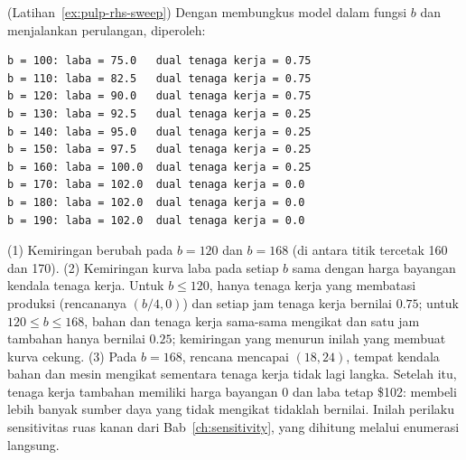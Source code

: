 \begin{solution}(Latihan~\ref{ex:pulp-rhs-sweep})
Dengan membungkus model dalam fungsi $b$ dan menjalankan perulangan, diperoleh:
\begin{verbatim}
b = 100: laba = 75.0   dual tenaga kerja = 0.75
b = 110: laba = 82.5   dual tenaga kerja = 0.75
b = 120: laba = 90.0   dual tenaga kerja = 0.75
b = 130: laba = 92.5   dual tenaga kerja = 0.25
b = 140: laba = 95.0   dual tenaga kerja = 0.25
b = 150: laba = 97.5   dual tenaga kerja = 0.25
b = 160: laba = 100.0  dual tenaga kerja = 0.25
b = 170: laba = 102.0  dual tenaga kerja = 0.0
b = 180: laba = 102.0  dual tenaga kerja = 0.0
b = 190: laba = 102.0  dual tenaga kerja = 0.0
\end{verbatim}
(1) Kemiringan berubah pada $b = 120$ dan $b = 168$ (di antara titik tercetak 160 dan 170).
(2) Kemiringan kurva laba pada setiap $b$ sama dengan harga bayangan kendala tenaga kerja. Untuk $b \leq 120$, hanya tenaga kerja yang membatasi produksi (rencananya $(b/4, 0)$) dan setiap jam tenaga kerja bernilai $0.75$; untuk $120 \leq b \leq 168$, bahan dan tenaga kerja sama-sama mengikat dan satu jam tambahan hanya bernilai $0.25$; kemiringan yang menurun inilah yang membuat kurva cekung.
(3) Pada $b = 168$, rencana mencapai $(18, 24)$, tempat kendala bahan dan mesin mengikat sementara tenaga kerja tidak lagi langka. Setelah itu, tenaga kerja tambahan memiliki harga bayangan $0$ dan laba tetap \$102: membeli lebih banyak sumber daya yang tidak mengikat tidaklah bernilai. Inilah perilaku sensitivitas ruas kanan dari Bab~\ref{ch:sensitivity}, yang dihitung melalui enumerasi langsung.
\end{solution}
